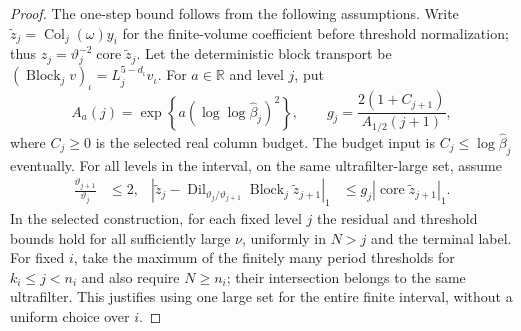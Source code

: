 \begin{proof}
The one-step bound follows from the following assumptions. Write
$\widetilde z_j=\operatorname{Col}_j(\omega)y_i$ for the finite-volume
coefficient before threshold normalization; thus
$z_j=\vartheta_j^{-2}\operatorname{core}\widetilde z_j$. Let the
deterministic block transport be
$(\operatorname{Block}_j v)_\iota=L_j^{5-d_\iota}v_\iota$.
For $a\in\mathbb R$ and level $j$, put
\[
 A_a(j)=\exp\!\left\{a(\log\log\widehat\beta_j)^2\right\},\qquad
 g_j=\frac{2(1+C_{j+1})}{A_{1/2}(j+1)},
\]
where $C_j\ge0$ is the selected real column budget. The budget input is
$C_j\le\log\widehat\beta_j$ eventually. For all levels in the interval,
on the same ultrafilter-large set, assume
\begin{align}
 \frac{\vartheta_{j+1}}{\vartheta_j}&\le2, &
 |\widetilde z_j-\operatorname{Dil}_{\vartheta_j/\vartheta_{j+1}}\operatorname{Block}_j\widetilde z_{j+1}|_1
 &\le g_j|\operatorname{core}\widetilde z_{j+1}|_1.
 \label{eq:trace-sensor-raw-step}
\end{align}
In the selected construction, for each fixed level $j$ the residual and
threshold bounds hold for all sufficiently large $\nu$, uniformly in $N>j$
and the terminal label. For fixed $i$, take the maximum
of the finitely many period thresholds for $k_i\le j<n_i$ and also require
$N\ge n_i$; their intersection belongs to the same ultrafilter. This
justifies using one large set for the entire finite interval, without a
uniform choice over $i$.


\end{proof}
